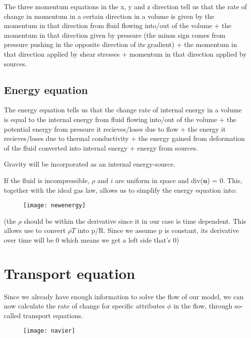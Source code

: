 The three momentum equations in the x, y and z direction tell us that the rate of change in momentum in a certain direction in a volume is given by the momentum in that direction from fluid flowing into/out of the volume + the momentum in that direction given by pressure (the minus sign comes from pressure pushing in the opposite direction of its gradient) + the momentum in that direction applied by shear stresses + momentum in that direction applied by sources.

\subsection{Energy equation}

The energy equation tells us that the change rate of internal energy in a volume is equal to the internal energy from fluid flowing into/out of the volume + the potential energy from pressure it recieves/loses due to flow + the energy it recieves/loses due to thermal conductivity + the energy gained from deformation of the fluid converted into internal energy + energy from sources.

Gravity will be incorporated as an internal energy-source.

If the fluid is incompressible, $\rho$ and $i$ are uniform in space and div($\mathbf{u}$) = 0. This, together with the ideal gas law, allows us to simplify the energy equation into:

\begin{figure}[h]
\texttt{[image: newenergy]}
\end{figure}

(the $\rho$ should be within the derivative since it in our case is time dependent. This allows use to convert $\rho T$ into p/R. Since we assume p is constant, its derivative over time will be 0 which means we get a left side that's 0)

\section{Transport equation}

Since we already have enough information to solve the flow of our model, we can now calculate the rate of change for specific attributes $\phi$ in the flow, through so-called transport equations.

\begin{figure}[h]
\texttt{[image: navier]}
\end{figure}

